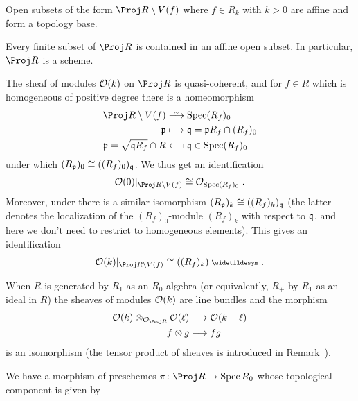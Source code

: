 \documentclass[a4paper,parskip=half,numbers=enddot, DIV=12]{scrreprt}
\begin{document}
\begin{prop}
	\begin{alphanumerate}
		\item {}Open subsets of the form $\Proj R\setminus V(f)$ where $f\in R_k$ with $k>0$ are affine and form a topology base.
		\item Every finite subset of $\Proj R$ is contained in an affine open subset. In particular, $\Proj R$ is a scheme.
		\item The sheaf of modules $\mathcal{O}(k)$ on $\Proj R$ is quasi-coherent, and for $f\in R$ which is homogeneous of positive degree there is a homeomorphism
		\begin{align}\lbl{eq:ProjLocal}
			\begin{split}
				\Proj R\setminus V(f)&\isomorphism \Spec (R_f)_0\\
				\pp &\longmapsto \qq=\pp R_f\cap (R_f)_0\\
				\pp=\sqrt{\qq R_f}\cap R&\longmapsfrom \qq\in\Spec (R_f)_0
			\end{split}
		\end{align}
		under which $(R_{\mathfrak{p}})_0\cong ((R_f)_0)_{\mathfrak{q}}$. We thus get an identification 
		\begin{align*}
			\Oo(0)|_{\Proj R\setminus V(f)}\cong \Oo_{\Spec (R_f)_0}\;.
		\end{align*}		
		Moreover, under  there is a similar isomorphism $(R_{\mathfrak{p}})_k\cong ((R_f)_k)_{\mathfrak{q}}$ (the latter denotes the localization of the $(R_f)_0$-module $(R_f)_k$ with respect to $\mathfrak{q}$, and here we don't need to restrict to homogeneous elements). This gives an identification
		\begin{align}\lbl{eq:O(k)isQC}
			\Oo(k)|_{\Proj R\setminus V(f)}\cong ((R_f)_k)^\qcmod\;.
		\end{align}
		\item When $R$ is generated by $R_1$ as an $R_0$-algebra (or equivalently, $R_+$ by $R_1$ as an ideal in $R$) the sheaves of modules $\mathcal{O}(k)$ are line bundles and the morphism 
		\begin{align*}
			\Oo(k)\otimes_{\Oo_{\Proj R}}\Oo(\ell)&\morphism\Oo(k+\ell)\\
			f\otimes g&\longmapsto fg
		\end{align*}
		is an isomorphism (the tensor product of sheaves is introduced in Remark~).
		\item We have a morphism of preschemes $\pi\colon\Proj R\morphism \Spec R_0$ whose topological component is given by

\end{alphanumerate}
\end{prop}
\end{document}
